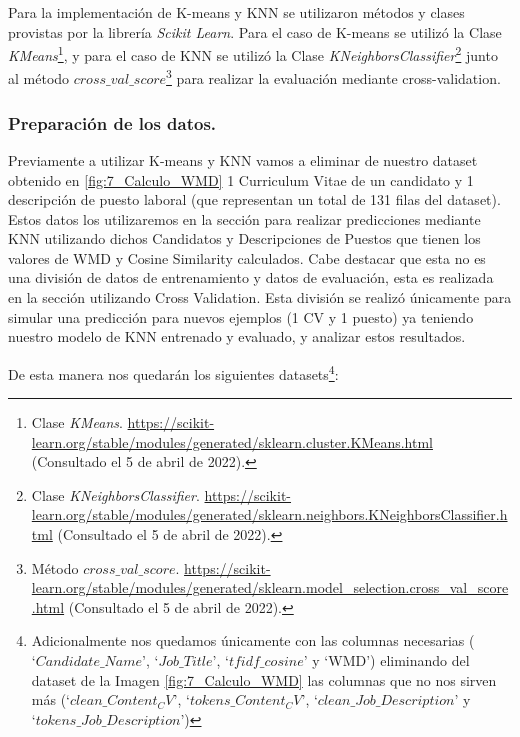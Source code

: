 \documentclass[12pt,a4paper]{article}
\begin{document}
\begin{sloppypar}
Para la implementación de K-means y KNN se utilizaron métodos y clases provistas por la librería \textit{Scikit Learn}. Para el caso de K-means se utilizó la Clase \textit{KMeans}\footnote{Clase \textit{KMeans}. \url{https://scikit-learn.org/stable/modules/generated/sklearn.cluster.KMeans.html} (Consultado el 5 de abril de 2022).}, y para el caso de KNN se utilizó la Clase \textit{KNeighborsClassifier}\footnote{Clase \textit{KNeighborsClassifier}. \url{https://scikit-learn.org/stable/modules/generated/sklearn.neighbors.KNeighborsClassifier.html} (Consultado el 5 de abril de 2022).} junto al método \textit{$cross\_val\_score$}\footnote{Método \textit{$cross\_val\_score$}. \url{https://scikit-learn.org/stable/modules/generated/sklearn.model_selection.cross_val_score.html} (Consultado el 5 de abril de 2022).} para realizar la evaluación mediante cross-validation. \\

\subsubsection{Preparación de los datos.}\label{prep_datosd}

Previamente a utilizar K-means y KNN vamos a eliminar de nuestro dataset obtenido en \ref{fig:7_Calculo_WMD} 1 Curriculum Vitae de un candidato y 1 descripción de puesto laboral (que representan un total de 131 filas del dataset). Estos datos los utilizaremos en la sección \textit{} para realizar predicciones mediante KNN utilizando dichos Candidatos y Descripciones de Puestos que tienen los valores de WMD y Cosine Similarity calculados. Cabe destacar que esta no es una división de datos de entrenamiento y datos de evaluación, esta es realizada en la sección \textit{} utilizando Cross Validation. Esta división se realizó únicamente para simular una predicción para nuevos ejemplos (1 CV y 1 puesto) ya teniendo nuestro modelo de KNN entrenado y evaluado, y analizar estos resultados. 

\cleardoublepage

De esta manera nos quedarán los siguientes datasets\footnote{Adicionalmente nos quedamos únicamente con las columnas necesarias ($‘Candidate\_Name’$, $‘Job\_Title’$, $‘tfidf\_cosine’$ y ‘WMD’) eliminando del dataset de la Imagen \ref{fig:7_Calculo_WMD} las columnas que no nos sirven más ($‘clean\_Content_CV’$, $‘tokens\_Content_CV’$, $‘clean\_Job\_Description’$ y $‘tokens\_Job\_Description’$)}:


\end{sloppypar}
\end{document}
